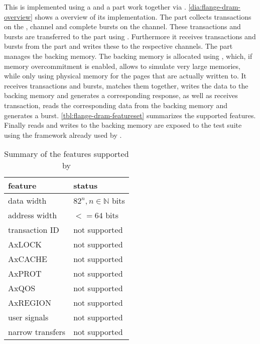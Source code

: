 This is implemented using a \systemverilog{} and a \cpp{} part work together via \DPI{}. \autoref{dia:flange-dram-overview} shows a overview of its implementation. The \systemverilog{} part collects transactions on the \AW{}, \AR{} \AXI{} channel and complete bursts on the \W{} \AXI{} channel. These transactions and bursts are transferred to the \cpp{} part using \DPI{}. Furthermore it receives \B{} transactions and \R{} bursts from the \cpp{} part and writes these to the respective \AXI{} channels.
The \cpp{} part manages the backing memory. The backing memory is allocated using \mmap{}, which, if memory overcommitment is enabled, allows to simulate very large memories, while only using physical memory for the pages that are actually written to. It receives \AW{} transactions and \W{} bursts, matches them together, writes the data to the backing memory and generates a corresponding \B{} response, as well as receives \AR{} transaction, reads the corresponding data from the backing memory and generates a \R{} burst. \autoref{tbl:flange-dram-featureset} summarizes the supported \AXI{} features. Finally reads and writes to the backing memory are exposed to the test suite using the \RCF{} framework already used by \flange{}.


\begin{table}
  \begin{center}
\begin{tabular}{ll}
  \toprule
  feature & status \\
  \midrule
  data width & $8 2^{n}, n ∈ ℕ$ bits \\
  address width & $<= 64$ bits \\
  transaction ID & not supported \\
  AxLOCK & not supported \\
  AxCACHE & not supported \\
  AxPROT & not supported \\
  AxQOS & not supported \\
  AxREGION & not supported \\
  user signals & not supported \\
  narrow transfers & not supported \\
  \bottomrule
\end{tabular}
  \end{center}
\caption{Summary of the \AXI{} features supported by \flangedram}\label{tbl:flange-dram-featureset}
\end{table}

